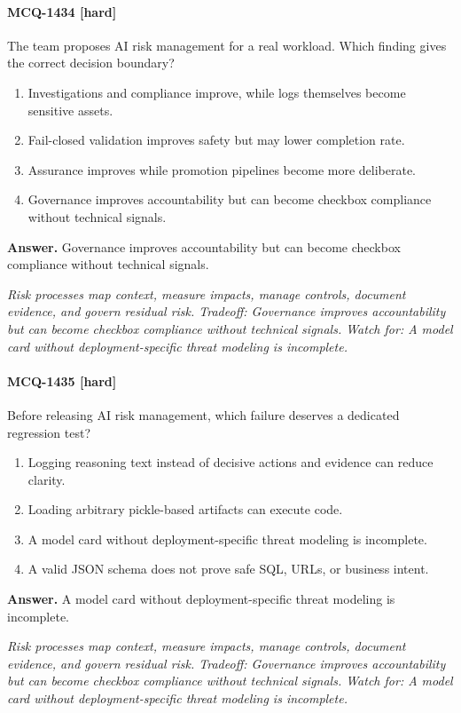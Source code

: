 \paragraph{MCQ-1434 [hard]} The team proposes AI risk management for a real workload. Which finding gives the correct decision boundary?
\begin{enumerate}[label=\Alph*.]
\item Investigations and compliance improve, while logs themselves become sensitive assets.
\item Fail-closed validation improves safety but may lower completion rate.
\item Assurance improves while promotion pipelines become more deliberate.
\item Governance improves accountability but can become checkbox compliance without technical signals.
\end{enumerate}
\noindent\textbf{Answer.} Governance improves accountability but can become checkbox compliance without technical signals.
\par\textit{Risk processes map context, measure impacts, manage controls, document evidence, and govern residual risk. Tradeoff: Governance improves accountability but can become checkbox compliance without technical signals. Watch for: A model card without deployment-specific threat modeling is incomplete.}
\paragraph{MCQ-1435 [hard]} Before releasing AI risk management, which failure deserves a dedicated regression test?
\begin{enumerate}[label=\Alph*.]
\item Logging reasoning text instead of decisive actions and evidence can reduce clarity.
\item Loading arbitrary pickle-based artifacts can execute code.
\item A model card without deployment-specific threat modeling is incomplete.
\item A valid JSON schema does not prove safe SQL, URLs, or business intent.
\end{enumerate}
\noindent\textbf{Answer.} A model card without deployment-specific threat modeling is incomplete.
\par\textit{Risk processes map context, measure impacts, manage controls, document evidence, and govern residual risk. Tradeoff: Governance improves accountability but can become checkbox compliance without technical signals. Watch for: A model card without deployment-specific threat modeling is incomplete.}
